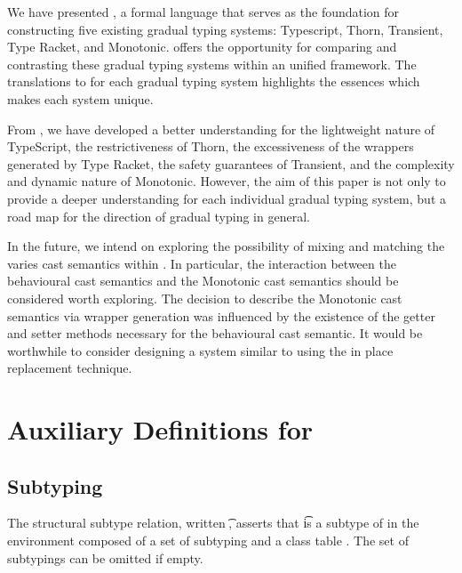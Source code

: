 \documentclass[a4paper,USenglish]{tex/lipics-v2016}
\begin{document}
We have presented \kafka, a formal language that serves as the foundation for 
constructing five existing gradual typing systems: Typescript, Thorn, Transient, 
Type Racket, and Monotonic. \kafka offers the opportunity for comparing and 
contrasting these gradual typing systems within an unified framework. The translations
to \kafka for each gradual typing system highlights the essences which makes each system unique.

From \kafka, we have developed a better understanding for the lightweight nature of TypeScript,
the restrictiveness of Thorn, the excessiveness of the wrappers generated by Type Racket,
the safety guarantees of Transient, and the complexity and dynamic nature of Monotonic.
However, the aim of this paper is not only to provide a deeper understanding for each
individual gradual typing system, but a road map for the direction of gradual typing in general.

In the future, we intend on exploring the possibility of mixing and matching the varies 
cast semantics within \kafka. In particular, the interaction between the behavioural cast semantics 
and the Monotonic cast semantics should be considered worth exploring.
The decision to describe the Monotonic cast semantics via wrapper generation was influenced
by the existence of the getter and setter methods necessary for the behavioural cast semantic.
It would be worthwhile to consider designing a system similar to \kafka using the in place 
replacement technique. 


\clearpage




\appendix
\section{Auxiliary Definitions for \kafka}%

\subsection{Subtyping}

The structural subtype relation, written \StrSub\M\K\t\tp, asserts that \t
is a subtype of \tp in the environment composed of a set of subtyping \M and
a class table \K.   The set of subtypings can be omitted if empty.
\end{document}
